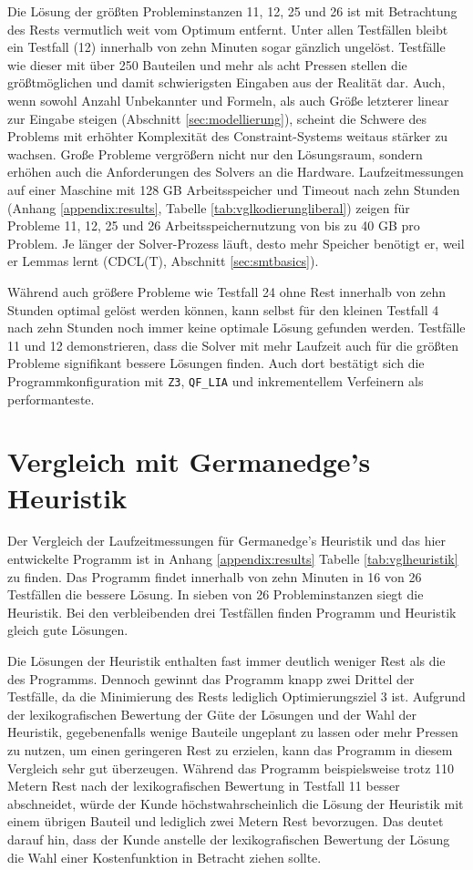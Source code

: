 Die Lösung der größten Probleminstanzen 11, 12, 25 und 26 ist mit Betrachtung des Rests vermutlich weit vom Optimum entfernt.
Unter allen Testfällen bleibt ein Testfall (12) innerhalb von zehn Minuten sogar gänzlich ungelöst.
Testfälle wie dieser mit über 250 Bauteilen und mehr als acht Pressen stellen die größtmöglichen und damit schwierigsten Eingaben aus der Realität dar.
Auch, wenn sowohl Anzahl Unbekannter und Formeln, als auch Größe letzterer linear zur Eingabe steigen (Abschnitt \ref{sec:modellierung}),
scheint die Schwere des Problems mit erhöhter Komplexität des Constraint-Systems weitaus stärker zu wachsen.
Große Probleme vergrößern nicht nur den Lösungsraum, sondern erhöhen auch die Anforderungen des Solvers an die Hardware.
Laufzeitmessungen auf einer Maschine mit 128 GB Arbeitsspeicher und Timeout nach zehn Stunden (Anhang \ref{appendix:results}, Tabelle \ref{tab:vglkodierungliberal}) zeigen für Probleme
11, 12, 25 und 26 Arbeitsspeichernutzung von bis zu 40 GB pro Problem.
Je länger der Solver-Prozess läuft, desto mehr Speicher benötigt er, weil er Lemmas lernt (CDCL(T), Abschnitt \ref{sec:smtbasics}).

Während auch größere Probleme wie Testfall 24 ohne Rest innerhalb von zehn Stunden optimal gelöst werden können, kann selbst für den kleinen Testfall 4 nach zehn Stunden
noch immer keine optimale Lösung gefunden werden.
Testfälle 11 und 12 demonstrieren, dass die Solver mit mehr Laufzeit auch für die größten Probleme signifikant bessere Lösungen finden.
Auch dort bestätigt sich die Programmkonfiguration mit \texttt{Z3}, \texttt{QF\_LIA} und inkrementellem Verfeinern als performanteste.

\section{Vergleich mit Germanedge's Heuristik}
Der Vergleich der Laufzeitmessungen für Germanedge's Heuristik und das hier entwickelte Programm ist in Anhang \ref{appendix:results} Tabelle \ref{tab:vglheuristik} zu finden.
Das Programm findet innerhalb von zehn Minuten in 16 von 26 Testfällen die bessere Lösung.
In sieben von 26 Probleminstanzen siegt die Heuristik.
Bei den verbleibenden drei Testfällen finden Programm und Heuristik gleich gute Lösungen.

Die Lösungen der Heuristik enthalten fast immer deutlich weniger Rest als die des Programms.
Dennoch gewinnt das Programm knapp zwei Drittel der Testfälle, da die Minimierung des Rests lediglich Optimierungsziel 3 ist.
Aufgrund der lexikografischen Bewertung der Güte der Lösungen und der Wahl der Heuristik, gegebenenfalls wenige Bauteile ungeplant zu lassen oder mehr Pressen zu nutzen,
um einen geringeren Rest zu erzielen, kann das Programm in diesem Vergleich sehr gut überzeugen.
Während das Programm beispielsweise trotz 110 Metern Rest nach der lexikografischen Bewertung in Testfall 11 besser abschneidet, würde der Kunde höchstwahrscheinlich die
Lösung der Heuristik mit einem übrigen Bauteil und lediglich zwei Metern Rest bevorzugen.
Das deutet darauf hin, dass der Kunde anstelle der lexikografischen Bewertung der Lösung die Wahl einer Kostenfunktion in Betracht ziehen sollte.

